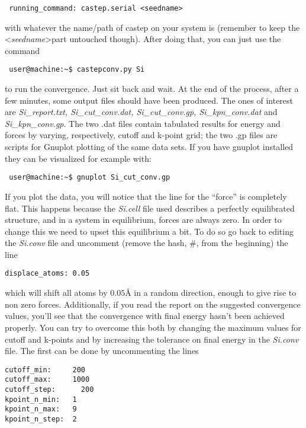 \documentclass[10pt]{article}
\begin{document}
\begin{lstlisting}
 running_command: castep.serial <seedname>
\end{lstlisting}

with whatever the name/path of castep on your system is (remember to keep the \textless \textit{seedname}\textgreater part untouched though). After doing that, you can just use the command

\begin{lstlisting}
 user@machine:~$ castepconv.py Si
\end{lstlisting}

to run the convergence. Just sit back and wait. At the end of the process, after a few minutes, some output files should have been produced. The ones of interest are \textit {Si\_report.txt, Si\_cut\_conv.dat, Si\_cut\_conv.gp, Si\_kpn\_conv.dat} and \textit{Si\_kpn\_conv.gp}. The two .dat files contain tabulated results for energy and forces by varying, respectively, cutoff and k-point grid; the two .gp files are scripts for Gnuplot plotting of the same data sets. If you have gnuplot installed they can be visualized for example with:

\begin{lstlisting}
 user@machine:~$ gnuplot Si_cut_conv.gp
\end{lstlisting}

If you plot the data, you will notice that the line for the ``force'' is completely flat. This happens because the \textit{Si.cell} file used describes a perfectly equilibrated structure, and in a system in equilibrium, forces are always zero. In order to change this we need to upset this equilibrium a bit. To do so go back to editing the \textit{Si.conv} file and uncomment (remove the hash, \#, from the beginning) the line

\begin{lstlisting}
displace_atoms: 0.05
\end{lstlisting}

which will shift all atoms by $0.05 $\AA{} in a random direction, enough to give rise to non zero forces. Additionally, if you read the report on the suggested convergence values, you'll see that the convergence with final energy hasn't been achieved properly. You can try to overcome this both by changing the maximum values for cutoff and k-points and by increasing the tolerance on final energy in the \textit{Si.conv} file. The first can be done by uncommenting the lines

\begin{lstlisting}
cutoff_min:     200
cutoff_max:     1000
cutoff_step:	  200
kpoint_n_min:   1
kpoint_n_max:   9
kpoint_n_step:  2
\end{lstlisting}
\end{document}
